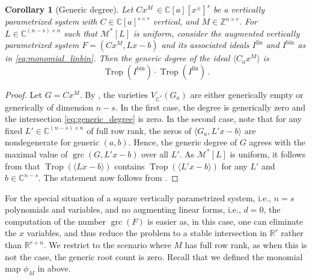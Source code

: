 \documentclass[11pt,reqno,a4paper]{amsart}
\numberwithin{equation}{section}
\theoremstyle{theoremstyle}
\newtheorem{corollary}[theorem]{Corollary}
\theoremstyle{examplestyle}
\newcommand{\CC}{\mathbb{C}}
\newcommand{\RR}{\mathbb{R}}
\newcommand{\lin}{{\mathrm{lin}}}
\newcommand{\bin}{{\mathrm{bin}}}
\DeclareMathOperator{\grc}{grc}
\DeclareMathOperator{\Trop}{Trop}
\begin{document}
 
\begin{corollary}[Generic degree]\label{cor:generic_degree}
Let $C x^M  \, \in \CC[a][x^\pm]^s$ be a  vertically parametrized system
with    $C\in \CC[a]^{s\times r}$ vertical, and  $M\in \mathbb{Z}^{n\times r}$. For $L\in \CC^{(n-s)\times n}$ such that $\mathcal{M}^*[L]$ is uniform, consider the augmented vertically parametrized system $F=(C x^M,Lx-b)$ and its associated ideals $I^{\lin}$ and $I^{\bin}$ as in \eqref{eq:monomial_linbin}. Then 
 the generic degree of the ideal 
 $\langle C_a x^M \rangle$  is
\begin{equation}\label{eq:generic_degree} 
\Trop(I^{\bin}) \cdot \Trop(I^{\lin})\, .
\end{equation}
\end{corollary}
\begin{proof}
Let $G=C x^M$. 
By \cite[Theorem 3.7]{FeliuHenrikssonPascual2025vertical}, 
the varieties $V_{\CC^*}(G_a)$ are either generically empty or generically of dimension $n-s$. In the first case, the degree is generically zero and the intersection \eqref{eq:generic_degree} is zero. In the second case, 
note that for any fixed $L'\in\CC^{(n-s)\times n}$ of full row rank, the zeros of $\langle G_a,L' x-b \rangle$ are  nondegenerate for generic $(a,b)$. Hence, the generic degree of $G$ agrees with the maximal value of
$\grc(G,L'x-b)$ over all $L'$.
As $\mathcal{M}^*[L]$ is uniform, it follows from  that $\Trop(\langle Lx-b\rangle)$ contains $\Trop(\langle L'x-b\rangle)$ for any $L'$ and $b\in\CC^{n-s}$. The statement now follows from . 
\end{proof}


For the special situation of a square vertically parametrized system, i.e., $n=s$ polynomials and variables, and no augmenting linear forms, i.e., $d=0$, the computation of the number $\grc(F)$ is easier as, in this case, one can eliminate the $x$ variables, and thus reduce the problem to a stable intersection in $\RR^r$ rather than $\RR^{r+n}$. 
We restrict to the scenario where $M$ has full row rank, as when this is not the case, the generic root count is zero. Recall that we defined the monomial map $\phi_M$ in  above. 
\end{document}
